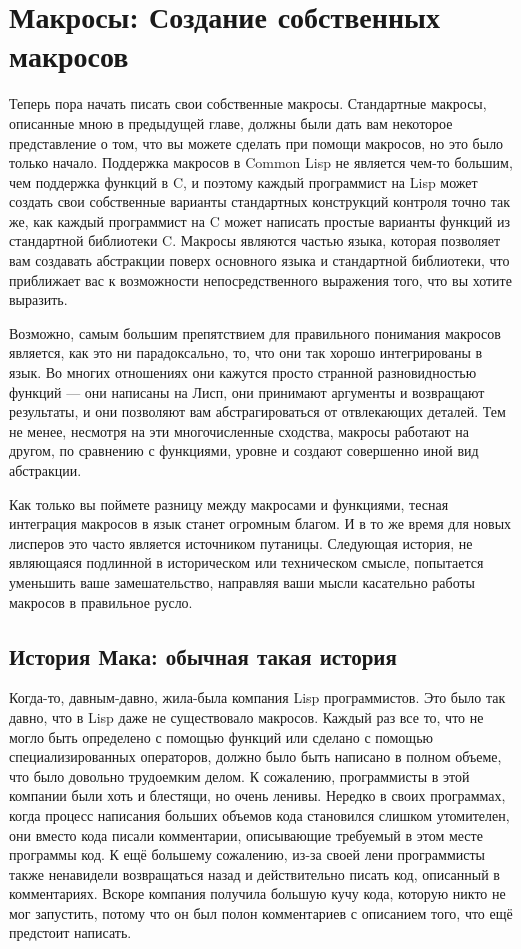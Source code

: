 \chapter{Макросы: Создание собственных макросов}
\label{ch:08}

Теперь пора начать писать свои собственные макросы. Стандартные макросы, описанные мною в
предыдущей главе, должны были дать вам некоторое представление о том, что вы можете
сделать при помощи макросов, но это было только начало. Поддержка макросов в Common Lisp
не является чем-то большим, чем поддержка функций в C, и поэтому каждый программист на
Lisp может создать свои собственные варианты стандартных конструкций контроля точно так
же, как каждый программист на C может написать простые варианты функций из стандартной
библиотеки C. Макросы являются частью языка, которая позволяет вам создавать абстракции
поверх основного языка и стандартной библиотеки, что приближает вас к возможности
непосредственного выражения того, что вы хотите выразить.

Возможно, самым большим препятствием для правильного понимания макросов является, как это
ни парадоксально, то, что они так хорошо интегрированы в язык. Во многих отношениях они
кажутся просто странной разновидностью функций --- они написаны на Лисп, они принимают
аргументы и возвращают результаты, и они позволяют вам абстрагироваться от отвлекающих
деталей. Тем не менее, несмотря на эти многочисленные сходства, макросы работают на
другом, по сравнению с функциями, уровне и создают совершенно иной вид абстракции.

Как только вы поймете разницу между макросами и функциями, тесная интеграция макросов в
язык станет огромным благом. И в то же время для новых лисперов это часто является
источником путаницы. Следующая история, не являющаяся подлинной в историческом или
техническом смысле, попытается уменьшить ваше замешательство, направляя ваши мысли
касательно работы макросов в правильное русло.

\section{История Мака: обычная такая история}

Когда-то, давным-давно, жила-была компания Lisp программистов. Это было так давно, что в
Lisp даже не существовало макросов. Каждый раз все то, что не могло быть определено с
помощью функций или сделано с помощью специализированных операторов, должно было быть
написано в полном объеме, что было довольно трудоемким делом. К сожалению, программисты в
этой компании были хоть и блестящи, но очень ленивы. Нередко в своих программах, когда
процесс написания больших объемов кода становился слишком утомителен, они вместо кода
писали комментарии, описывающие требуемый в этом месте программы код. К ещё большему
сожалению, из-за своей лени программисты также ненавидели возвращаться назад и
действительно писать код, описанный в комментариях. Вскоре компания получила большую кучу
кода, которую никто не мог запустить, потому что он был полон комментариев с описанием
того, что ещё предстоит написать.

